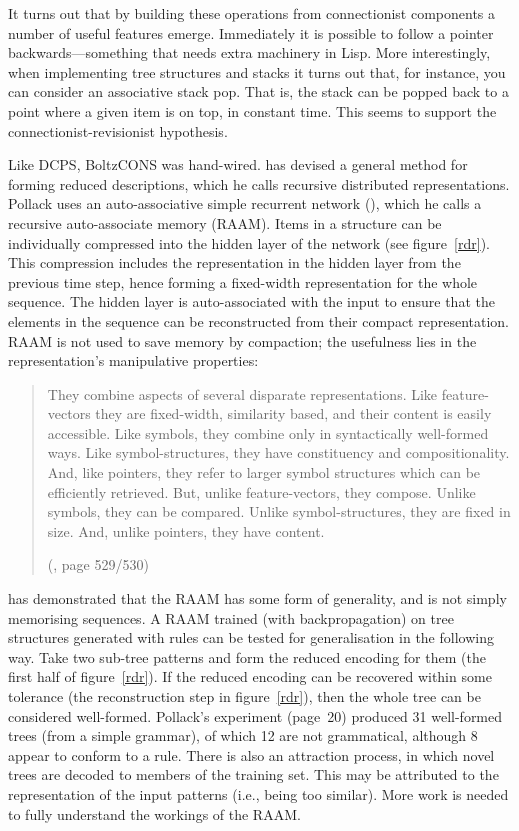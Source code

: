 It turns out that by building these operations from connectionist
components a number of useful features emerge.  Immediately it is
possible to follow a pointer backwards---something that needs extra
machinery in Lisp.  More interestingly, when implementing tree
structures and stacks it turns out that, for instance, you can
consider an associative stack pop.  That is, the stack can be popped
back to a point where a given item is on top, in constant time.  This
seems to support the connectionist-revisionist hypothesis.

Like DCPS, BoltzCONS was hand-wired.   has devised a
general method for forming reduced descriptions, which he calls
recursive distributed representations.  Pollack uses an
auto-associative simple recurrent network (), which he
calls a recursive auto-associate memory (RAAM). Items in a structure
can be individually compressed into the hidden layer of the network
(see figure~\ref{rdr}). This compression includes the representation
in the hidden layer from the previous time step, hence forming a
fixed-width representation for the whole sequence.  The hidden layer
is auto-associated with the input to ensure that the elements in the
sequence can be reconstructed from their compact representation. RAAM
is not used to save memory by compaction; the usefulness lies in the
representation's manipulative properties:
\begin{quotation}\small
\noindent They combine aspects of several disparate representations.
Like feature-vectors they are fixed-width, similarity based, and their
content is easily accessible.  Like symbols, they combine only in
syntactically well-formed ways. Like symbol-structures, they have
constituency and compositionality. And, like pointers, they refer to
larger symbol structures which can be efficiently retrieved. But,
unlike feature-vectors, they compose. Unlike symbols, they can be
compared. Unlike symbol-structures, they are fixed in size. And,
unlike pointers, they have content.

\hfill (, page 529/530)
\end{quotation}

 has demonstrated that the RAAM has some
form of generality, and is not simply memorising sequences.  A RAAM
trained (with backpropagation) on tree structures generated with
rules can be tested for generalisation in the following way.  Take two
sub-tree patterns and form the reduced encoding for them (the first
half of figure~\ref{rdr}).  If the reduced encoding can be recovered
within some tolerance (the reconstruction step in figure~\ref{rdr}),
then the whole tree can be considered well-formed.  Pollack's
experiment (page~20) produced 31 well-formed trees (from a simple
grammar), of which 12 are not grammatical, although 8 appear to
conform to a rule. There is also an attraction process, in which novel
trees are decoded to members of the training set.  This may be
attributed to the representation of the input patterns (i.e., being
too similar). More work is needed to fully understand the workings of
the RAAM.

